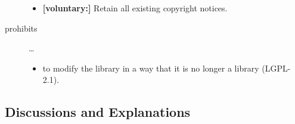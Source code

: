 \begin{description}
\begin{itemize}
  \item \textbf{[voluntary:]} Retain all existing copyright notices. 
  
\end{itemize}

\item[prohibits] \ldots
\begin{itemize}
  \item to modify the library in a way that it is no longer a library
  (LGPL-2.1).
\end{itemize}

\end{description}

\subsection{Discussions and Explanations}

